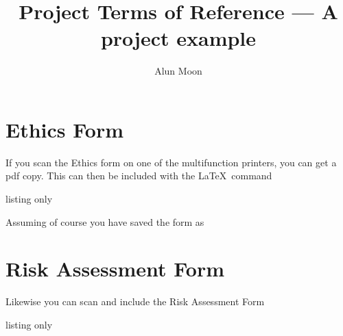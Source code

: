 \documentclass[12pt]{article}
\title{Project Terms of Reference --- A project example}
\author{Alun Moon}
\begin{document}
\maketitle




\appendix

\section{Ethics Form}
If you scan the Ethics form on one of the multifunction printers, you can get a pdf copy.  This can then be included with the \LaTeX\ command
\begin{tcblisting}{listing only}

\end{tcblisting}
Assuming of course you have saved the form  as 


\section{Risk Assessment Form}
Likewise you can scan and include the Risk Assessment Form
\begin{tcblisting}{listing only}

\end{tcblisting}
\end{document}
